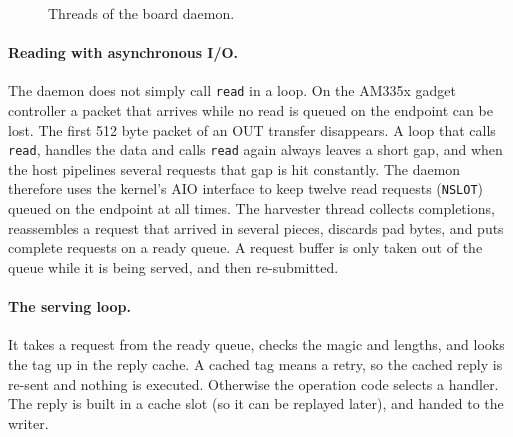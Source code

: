 \documentclass[11pt,a4paper,oneside]{report}
\newcommand{\code}[1]{\texttt{\small #1}}
\begin{document}
\begin{figure}[ht]
\centering
{}
\caption{Threads of the board daemon.}\label{fig:daemon}
\end{figure}

\paragraph{Reading with asynchronous I/O.} The daemon does not simply call \code{read} in a loop. On the AM335x gadget controller a packet that arrives while no read is queued on the endpoint can be lost. The first 512 byte packet of an OUT transfer disappears. A loop that calls \code{read}, handles the data and calls \code{read} again always leaves a short gap, and when the host pipelines several requests that gap is hit constantly. The daemon therefore uses the kernel's AIO interface to keep twelve read requests (\code{NSLOT}) queued on the endpoint at all times. The harvester thread collects completions, reassembles a request that arrived in several pieces, discards pad bytes, and puts complete requests on a ready queue. A request buffer is only taken out of the queue while it is being served, and then re-submitted.

\paragraph{The serving loop.} It takes a request from the ready queue, checks the magic and lengths, and looks the tag up in the reply cache. A cached tag means a retry, so the cached reply is re-sent and nothing is executed. Otherwise the operation code selects a handler. The reply is built in a cache slot (so it can be replayed later), and handed to the writer.
\end{document}
